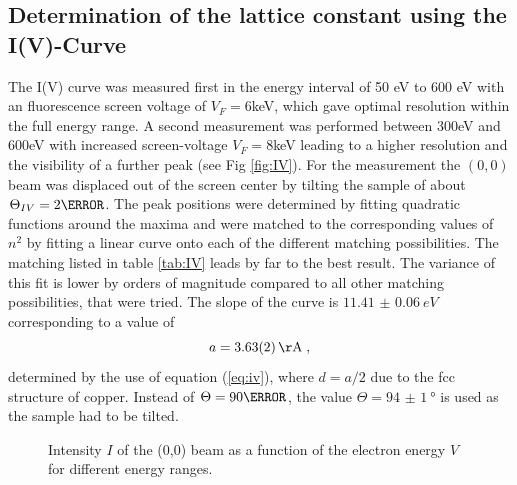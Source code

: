\documentclass[a4paper]{scrartcl}
\numberwithin{equation}{section}
\numberwithin{figure}{section}
\numberwithin{table}{section}
\newcommand{\eq}[2]{\begin{equation}#1\label{#2}\end{equation}}
\newcommand{\Formel}[1]{(\ref{#1})}
\begin{document}
\subsection{Determination of the lattice constant using the I(V)-Curve}
The I(V) curve was measured first in the energy interval of 50 eV to 600 eV with an fluorescence screen voltage of $V_F=6$keV, which gave optimal resolution within the full energy range. A second measurement was performed between 300eV and 600eV with increased screen-voltage $V_F=8$keV leading to a higher resolution and the visibility of a further peak (see Fig \ref{fig:IV}). For the measurement the $(0,0)$ beam was displaced out of the screen center by tilting the sample of about $\Theta_{IV}=2 \degree$. The peak positions were determined by fitting quadratic functions around the maxima and were matched to the corresponding values of $n^2$ by fitting a linear curve onto each of the different matching possibilities. The matching listed in table \ref{tab:IV} leads by far to the best result. The variance of this fit is lower by orders of magnitude compared to all other matching possibilities, that were tried. The slope of the curve is $\SI{11.41(6)}{eV}$ corresponding to a value of 
\eq{a = \SI{3.63(2)}{\AA}  \;,}{ivresult}
determined by the use of equation \Formel{eq:iv}, where $d=a/2$ due to the fcc structure of copper. Instead of $\Theta=90 \degree$, the value $\Theta=\SI{94(1)}{\degree}$ is used as the sample had to be tilted.

\begin{figure} 
 \centering
{}
\hfill
{}
	\caption{\small Intensity $I$ of the (0,0) beam as a function of the electron energy $V$ for different energy ranges.}
	\label{fig:IV1}
\end{figure}
\end{document}
